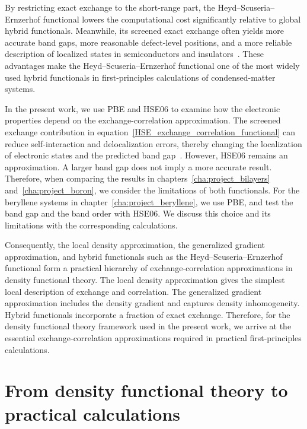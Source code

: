 By restricting exact exchange to the short-range part,
the Heyd--Scuseria--Ernzerhof functional lowers the computational cost significantly relative to global hybrid functionals.
Meanwhile, its screened exact exchange often yields more accurate band gaps,
more reasonable defect-level positions,
and a more reliable description of localized states in semiconductors and insulators~\cite{paier2006screened,krukau2006influence}.
These advantages make the Heyd--Scuseria--Ernzerhof functional one of the most widely used hybrid functionals in first-principles calculations of condensed-matter systems.

In the present work,
we use PBE and HSE06 to examine how the electronic properties depend on the exchange-correlation approximation.
The screened exchange contribution in equation~\eqref{HSE_exchange_correlation_functional}
can reduce self-interaction and delocalization errors,
thereby changing the localization of electronic states and the predicted band gap~\cite{cohen2012challenges}.
However, HSE06 remains an approximation.
A larger band gap does not imply a more accurate result.
Therefore, when comparing the results in chapters~\ref{cha:project_bilayers} and~\ref{cha:project_boron},
we consider the limitations of both functionals.
For the beryllene systems in chapter~\ref{cha:project_beryllene}, we use PBE, and test the band gap and the band order with HSE06.
We discuss this choice and its limitations with the corresponding calculations.

Consequently, the local density approximation,
the generalized gradient approximation,
and hybrid functionals such as the Heyd--Scuseria--Ernzerhof functional form a practical hierarchy of exchange-correlation approximations in density functional theory.
The local density approximation gives the simplest local description of exchange and correlation.
The generalized gradient approximation includes the density gradient and captures density inhomogeneity.
Hybrid functionals incorporate a fraction of exact exchange.
Therefore, for the density functional theory framework used in the present work,
we arrive at the essential exchange-correlation approximations required in practical first-principles calculations.

\newpage
\section{From density functional theory to practical calculations}
\label{sec:practical_computational_methods}

